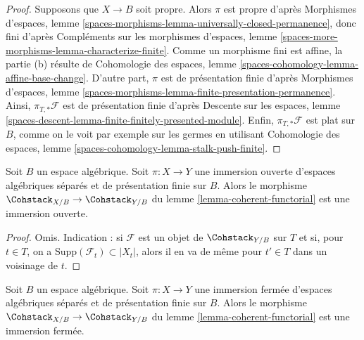 \begin{proof}
\medskip\noindent
Supposons que $X \to B$ soit propre. Alors $\pi$ est propre d'après
Morphismes d'espaces, lemme
\ref{spaces-morphisms-lemma-universally-closed-permanence}, donc fini
d'après Compléments sur les morphismes d'espaces, lemme
\ref{spaces-more-morphisms-lemma-characterize-finite}.
Comme un morphisme fini est affine, la partie (b) résulte de Cohomologie
des espaces, lemme \ref{spaces-cohomology-lemma-affine-base-change}.
D'autre part, $\pi$ est de présentation finie d'après Morphismes d'espaces,
lemme \ref{spaces-morphisms-lemma-finite-presentation-permanence}.
Ainsi, $\pi_{T, *}\mathcal{F}$ est de présentation finie d'après Descente
sur les espaces, lemme
\ref{spaces-descent-lemma-finite-finitely-presented-module}.
Enfin, $\pi_{T, *}\mathcal{F} $ est plat sur $B$, comme on le voit par
exemple sur les germes en utilisant Cohomologie des espaces, lemme
\ref{spaces-cohomology-lemma-stalk-push-finite}.
\end{proof}

\begin{lemma}
\label{lemma-coherent-open}
Soit $B$ un espace algébrique. Soit $\pi : X \to Y$ une immersion ouverte
d'espaces algébriques séparés et de présentation finie sur $B$.
Alors le morphisme $\Cohstack_{X/B} \to \Cohstack_{Y/B}$ du lemme
\ref{lemma-coherent-functorial} est une immersion ouverte.
\end{lemma}

\begin{proof}
Omis. Indication : si $\mathcal{F}$ est un objet de $\Cohstack_{Y/B}$
sur $T$ et si, pour $t \in T$, on a
$\text{Supp}(\mathcal{F}_t) \subset |X_t|$, alors il en va de même pour
$t' \in T$ dans un voisinage de $t$.
\end{proof}

\begin{lemma}
\label{lemma-coherent-closed}
Soit $B$ un espace algébrique. Soit $\pi : X \to Y$ une immersion fermée
d'espaces algébriques séparés et de présentation finie sur $B$.
Alors le morphisme $\Cohstack_{X/B} \to \Cohstack_{Y/B}$ du lemme
\ref{lemma-coherent-functorial} est une immersion fermée.
\end{lemma}

